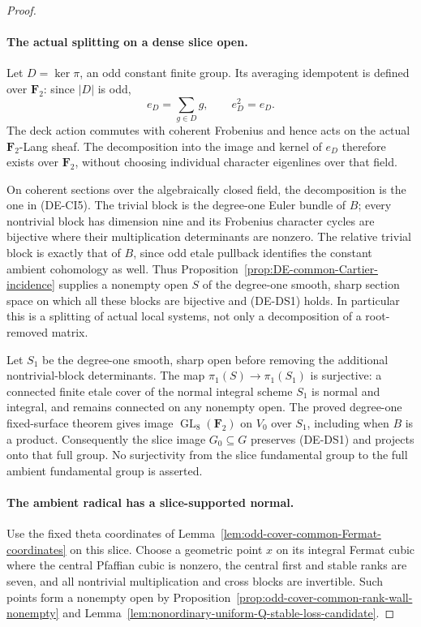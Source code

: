 \begin{proof}
\paragraph{The actual splitting on a dense slice open.}
Let \(D=\ker\pi\), an odd constant finite group. Its averaging
idempotent is defined over \(\mathbf F_2\): since \(|D|\) is odd,
\[
                   e_D=\sum_{g\in D}g,
                   \qquad e_D^2=e_D.
\]
The deck action commutes with coherent Frobenius and hence acts on
the actual \(\mathbf F_2\)-Lang sheaf. The decomposition into the
image and kernel of \(e_D\) therefore exists over \(\mathbf F_2\),
without choosing individual character eigenlines over that field.

On coherent sections over the algebraically closed field, the
decomposition is the one in (DE-CI5). The trivial block is the
degree-one Euler bundle of \(B\); every nontrivial block has
dimension nine and its Frobenius character cycles are bijective
where their multiplication determinants are nonzero. The relative
trivial block is exactly that of \(B\), since odd etale pullback
identifies the constant ambient cohomology as well. Thus
Proposition~\ref{prop:DE-common-Cartier-incidence} supplies a nonempty
open \(S\) of the degree-one smooth, sharp section space on which
all these blocks are bijective and (DE-DS1) holds. In particular
this is a splitting of actual local systems, not only a decomposition
of a root-removed matrix.

Let \(S_1\) be the degree-one smooth, sharp open before removing
the additional nontrivial-block determinants. The map
\(\pi_1(S)\to\pi_1(S_1)\) is surjective: a connected finite etale
cover of the normal integral scheme \(S_1\) is normal and integral,
and remains connected on any nonempty open. The proved degree-one
fixed-surface theorem gives image \(\operatorname{GL}_8(\mathbf F_2)\)
on \(V_0\) over \(S_1\), including when \(B\) is a product.
Consequently the slice image \(G_0\subseteq G\) preserves (DE-DS1)
and projects onto that full group. No surjectivity from the slice
fundamental group to the full ambient fundamental group is asserted.

\paragraph{The ambient radical has a slice-supported normal.}
Use the fixed theta coordinates of
Lemma~\ref{lem:odd-cover-common-Fermat-coordinates} on this slice.
Choose a geometric point \(x\) on its integral Fermat cubic where
the central Pfaffian cubic is nonzero, the central first and stable
ranks are seven, and all nontrivial multiplication and cross blocks
are invertible. Such points form a nonempty open by
Proposition~\ref{prop:odd-cover-common-rank-wall-nonempty} and
Lemma~\ref{lem:nonordinary-uniform-Q-stable-loss-candidate}.


\end{proof}

